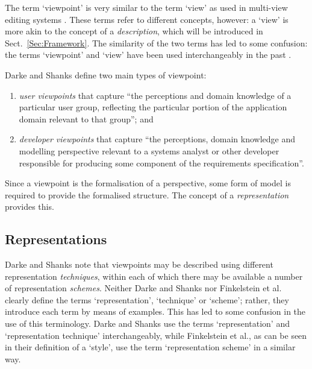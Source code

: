 \documentclass[11pt,oribibl]{llncs}
\begin{document}
The term `viewpoint' is very similar to the term `view' as used in multi-view editing systems \cite{Brow:MH:1992:Zeus,Grun:JC:1993:PhD,Jaco:DA:1995:MultiView,Meye:S:1991:IEEE}. These terms refer to different concepts, however: a `view' is more akin to the concept of a \emph{description}, which will be introduced in Sect.~\ref{Sec:Framework}. The similarity of the two terms has led to some confusion: the terms `viewpoint' and `view' have been used interchangeably in the past \cite{Jaco:DA:1995:MultiView}. 

Darke and Shanks \cite{Dark:P:1995} define two main types of viewpoint:
\begin{enumerate}
	\item \emph{user viewpoints} that capture ``the perceptions and domain knowledge of a particular user group, reflecting the particular portion of the application domain relevant to that group''; and
	\item \emph{developer viewpoints} that capture ``the perceptions, domain knowledge and modelling perspective relevant to a systems analyst or other developer responsible for producing some component of the requirements specification''.
\end{enumerate}

Since a viewpoint is the formalisation of a perspective, some form of model is required to provide the formalised structure. The concept of a \emph{representation} provides this.


\subsection{Representations}
\label{Sec:Background:Viewpoints:Representations}

Darke and Shanks \cite{Dark:P:1994:WP21/94} note that viewpoints may be described using different representation \emph{techniques}, within each of which there may be available a number of representation \emph{schemes}. Neither Darke and Shanks nor Finkelstein et al. \cite{Fink:ACW:1989} clearly define the terms `representation', `technique' or `scheme'; rather, they introduce each term by means of examples. This has led to some confusion in the use of this terminology. Darke and Shanks use the terms `representation' and `representation technique' interchangeably, while Finkelstein et al., as can be seen in their definition of a `style', use the term `representation scheme' in a similar way.
\end{document}
